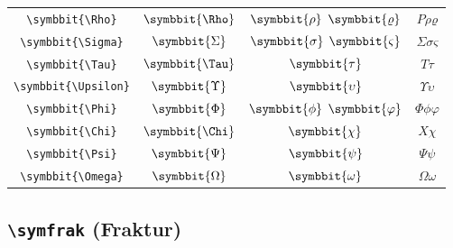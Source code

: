 \documentclass[12pt,a4paper]{article}
\begin{document}
\begin{longtable}{|c|c|c|c|}
\verb|\symbbit{\Rho}| & $\symbbit{\Rho}$ & $\symbbit{\rho}$ $\symbbit{\varrho}$ & $ Ρ 𝜌 𝜚 $ \\
\verb|\symbbit{\Sigma}| & $\symbbit{\Sigma}$ & $\symbbit{\sigma}$ $\symbbit{\varsigma}$ & $ Σ 𝜎 𝜍 $ \\
\verb|\symbbit{\Tau}| & $\symbbit{\Tau}$ & $\symbbit{\tau}$ & $ Τ 𝜏 $ \\
\verb|\symbbit{\Upsilon}| & $\symbbit{\Upsilon}$ & $\symbbit{\upsilon}$ & $ Υ 𝜐 $ \\
\verb|\symbbit{\Phi}| & $\symbbit{\Phi}$ & $\symbbit{\phi}$ $\symbbit{\varphi}$ & $ Φ 𝜙 𝜑 $ \\
\verb|\symbbit{\Chi}| & $\symbbit{\Chi}$ & $\symbbit{\chi}$ & $ Χ 𝜒 $ \\
\verb|\symbbit{\Psi}| & $\symbbit{\Psi}$ & $\symbbit{\psi}$ & $ Ψ 𝜓 $ \\
\verb|\symbbit{\Omega}| & $\symbbit{\Omega}$ & $\symbbit{\omega}$ & $ Ω 𝜔 $ \\
\hline
\end{longtable}

\newpage

\subsection*{\texttt{\textbackslash{}symfrak} (Fraktur)}
\end{document}
